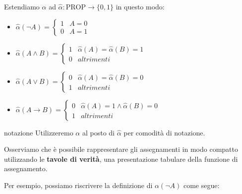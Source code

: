 \documentclass[a4paper,11pt]{report}
\begin{document}
Estendiamo \( \alpha \) ad \( \hat{\alpha} : \text{PROP} \to \{0,1\} \) in questo modo:
\vspace{0.5em}
\begin{itemize}
    \item \( \hat{\alpha}(\neg A) = \begin{cases}
            1 &  A = 0 \\
            0 & A = 1
        \end{cases}\)

        \vspace{0.5em}

    \item \( \hat{\alpha}(A \land B) = \begin{cases}
            1 & \hat{\alpha}(A) = \hat{\alpha}(B)  = 1 \\
            0 & altrimenti
        \end{cases}\)

        \vspace{0.5em}

    \item \( \hat{\alpha}(A \lor B) = \begin{cases}
            0 & \hat{\alpha}(A) = \hat{\alpha}(B)  = 0 \\
            1 & altrimenti
        \end{cases}\)

        \vspace{0.5em}

    \item \( \hat{\alpha}(A \to B) = \begin{cases}
            0 & \hat{\alpha}(A) = 1 \land \hat{\alpha}(B)  = 0 \\
            1 & altrimenti
        \end{cases}\)

\end{itemize}

\begin{gbox}{notazione}
    Utilizzeremo \( \alpha \) al posto di \( \hat{\alpha} \) per comodità di notazione.
\end{gbox}

Osserviamo che è possibile rappresentare gli assegnamenti in modo compatto utilizzando le \textbf{tavole di verità}, una presentazione tabulare della funzione di assegnamento.

Per esempio, possiamo riscrivere la definizione di \( \alpha(\neg A) \) come segue:
\end{document}
